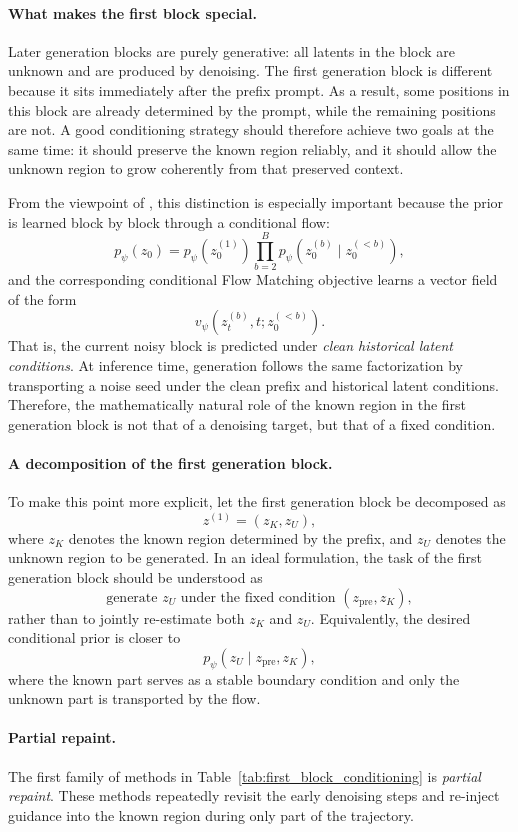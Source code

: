 \paragraph{What makes the first block special.}
Later generation blocks are purely generative: all latents in the block are unknown and are produced by denoising. The first generation block is different because it sits immediately after the prefix prompt. As a result, some positions in this block are already determined by the prompt, while the remaining positions are not. A good conditioning strategy should therefore achieve two goals at the same time: it should preserve the known region reliably, and it should allow the unknown region to grow coherently from that preserved context.

From the viewpoint of \method, this distinction is especially important because the prior is learned block by block through a conditional flow:
\[
p_\psi(z_0)=p_\psi(z_0^{(1)})\prod_{b=2}^{B} p_\psi(z_0^{(b)} \mid z_0^{(<b)}),
\]
and the corresponding conditional Flow Matching objective learns a vector field of the form
\[
v_\psi(z_t^{(b)}, t; z_0^{(<b)}).
\]
That is, the current noisy block is predicted under \emph{clean historical latent conditions}. At inference time, generation follows the same factorization by transporting a noise seed under the clean prefix and historical latent conditions. Therefore, the mathematically natural role of the known region in the first generation block is not that of a denoising target, but that of a fixed condition.

\paragraph{A decomposition of the first generation block.}
To make this point more explicit, let the first generation block be decomposed as
\[
z^{(1)} = (z_K, z_U),
\]
where \(z_K\) denotes the known region determined by the prefix, and \(z_U\) denotes the unknown region to be generated. In an ideal formulation, the task of the first generation block should be understood as
\[
\text{generate } z_U \text{ under the fixed condition } (z_{\mathrm{pre}}, z_K),
\]
rather than to jointly re-estimate both \(z_K\) and \(z_U\). Equivalently, the desired conditional prior is closer to
\[
p_\psi(z_U \mid z_{\mathrm{pre}}, z_K),
\]
where the known part serves as a stable boundary condition and only the unknown part is transported by the flow.

\paragraph{Partial repaint.}
The first family of methods in Table~\ref{tab:first_block_conditioning} is \emph{partial repaint}. These methods repeatedly revisit the early denoising steps and re-inject guidance into the known region during only part of the trajectory.

